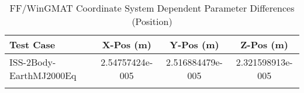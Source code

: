 \begin{table}[htbp!]
\centering
\caption{ FF/WinGMAT Coordinate System Dependent Parameter Differences (Position)}
      \begin{tabular}{lccc}
      \hline\hline
          Test Case & X-Pos (m) & Y-Pos (m) & Z-Pos (m) \\
         \hline
         ISS-2Body-EarthMJ2000Eq & 2.54757424e-005 & 2.516884479e-005 & 2.321598913e-005 \\
      \hline\hline
      \label{Table: FF-WinGMAT CS Parameters Set 1} 
\end{tabular}
\end{table}
